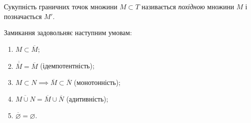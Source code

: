 \documentclass[a4paper, 12pt]{article}
\renewcommand{\emptyset}{\varnothing}
\begin{document}
\begin{definition}
	Сукупність граничних точок множини
	$M \subset T$ називається \textit{похідною} множини $M$ і позначається
	$M'$.
\end{definition}

\begin{theorem}
	Замикання
	задовольняє наступним умовам:
	\begin{enumerate}
		\item $M \subset \overline{M}$;
		\item $\overline{\overline{M}} = \overline{M}$ (ідемпотентність);
		\item $M \subset N \implies \overline{M} \subset \overline{N}$ (монотонність);
		\item $\overline{M \cup N} = \overline{M} \cup \overline{N}$ (адитивність);
		\item $\overline{\emptyset} = \emptyset$.
	\end{enumerate}
\end{theorem}
\end{document}
